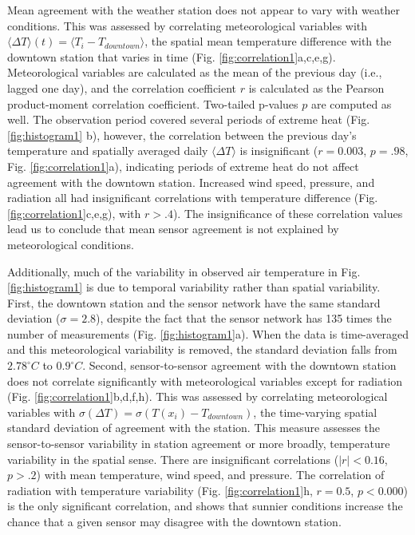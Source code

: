 Mean agreement with the weather station does not appear to vary with weather conditions. This was assessed by correlating meteorological variables with $\langle \Delta T \rangle \left( t \right)=\langle T_{i}- T_{downtown} \rangle$, the spatial mean temperature difference with the downtown station that varies in time (Fig. \ref{fig:correlation1}a,c,e,g). Meteorological variables are calculated as the mean of the previous day (i.e., lagged one day), and the correlation coefficient $r$ is calculated as the Pearson product-moment correlation coefficient. Two-tailed p-values $p$ are computed as well.  
The observation period covered several periods of extreme heat (Fig. \ref{fig:histogram1} b), however, the correlation between the previous day's temperature and spatially averaged daily $\langle \Delta T \rangle$ is insignificant ($r=0.003$, $p=.98$, Fig. \ref{fig:correlation1}a), indicating periods of extreme heat do not affect agreement with the downtown station. 
Increased wind speed, pressure, and radiation all had insignificant correlations with temperature difference (Fig. \ref{fig:correlation1}c,e,g), with $r >.4$). 
The insignificance of these correlation values lead us to conclude that mean sensor agreement is not explained by meteorological conditions. 
 
Additionally, much of the variability in observed air temperature in Fig. \ref{fig:histogram1} is due to temporal variability rather than spatial variability. First, the downtown station and the sensor network have the same standard deviation ($\sigma = 2.8$), despite the fact that the sensor network has 135 times the number of measurements (Fig. \ref{fig:histogram1}a). When the data is time-averaged and this meteorological variability is removed, the standard deviation falls from $2.78 ^{\circ} C$ to $0.9 ^{\circ} C$. 
Second, sensor-to-sensor agreement with the downtown station does not correlate significantly with meteorological variables except for radiation (Fig. \ref{fig:correlation1}b,d,f,h).  This was assessed by correlating meteorological variables with $\sigma \left( \Delta T \right)= \sigma {\left(T\left( x_i \right)- T_{downtown} \right) }$, the time-varying spatial standard deviation of agreement with the station. This measure assesses the sensor-to-sensor variability in station agreement or more broadly, temperature variability in the spatial sense. 
There are insignificant correlations ($ |r|<0.16$, $p >.2$) with mean temperature, wind speed, and pressure. 
The correlation of radiation with temperature variability (Fig. \ref{fig:correlation1}h, $r=0.5$, $ p < 0.000$) is the only significant correlation, and shows that sunnier conditions increase the chance that a given sensor may disagree with the downtown station.

